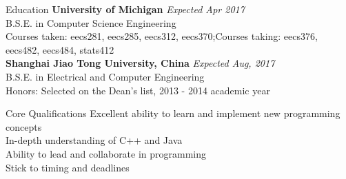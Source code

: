 \documentclass{resume} %
\begin{document}

\begin{rSection}{Education}
{\bf University of Michigan} \hfill {\em Expected Apr 2017} \\ 
B.S.E. in Computer Science Engineering\\
Courses taken: eecs281, eecs285, eecs312, eecs370;\quad Courses taking: eecs376, eecs482, eecs484, stats412\\
{\bf Shanghai Jiao Tong University, China} \hfill {\em Expected Aug, 2017} \\ 
B.S.E. in Electrical and Computer Engineering \\
Honors: Selected on the Dean's list, 2013 - 2014 academic year

\end{rSection}

\begin{rSection}{Core Qualifications}
	Excellent ability to learn and implement new programming concepts\\
	In-depth understanding of C++ and Java\\
	Ability to lead and collaborate in programming\\
	Stick to timing and deadlines
			
\end{rSection}
\end{document}
